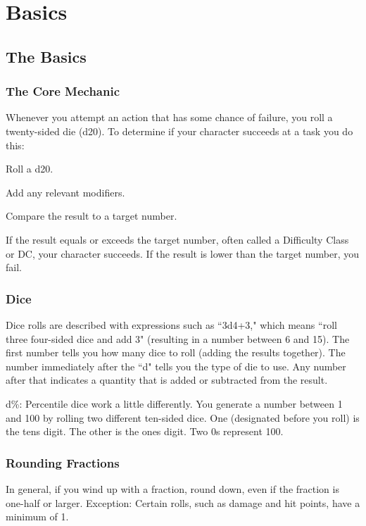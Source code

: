\chapter{Basics}

\section{The Basics}

\subsection{The Core Mechanic}
Whenever you attempt an action that has some chance of failure, you roll a twenty-sided die (d20). To determine if your character succeeds at a task you do this:
\begin{itemize*}
	\item Roll a d20.
	\item Add any relevant modifiers.
	\item Compare the result to a target number.
\end{itemize*}

If the result equals or exceeds the target number, often called a Difficulty Class or DC, your character succeeds. If the result is lower than the target number, you fail.

\subsection{Dice}
Dice rolls are described with expressions such as ``3d4+3," which means ``roll three four-sided dice and add 3" (resulting in a number between 6 and 15). The first number tells you how many dice to roll (adding the results together). The number immediately after the ``d" tells you the type of die to use. Any number after that indicates a quantity that is added or subtracted from the result.

d\%: Percentile dice work a little differently. You generate a number between 1 and 100 by rolling two different ten-sided dice. One (designated before you roll) is the tens digit. The other is the ones digit. Two 0s represent 100.

\subsection{Rounding Fractions}
In general, if you wind up with a fraction, round down, even if the fraction is one-half or larger.
Exception: Certain rolls, such as damage and hit points, have a minimum of 1.

